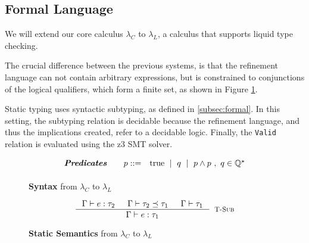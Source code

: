 \subsection{Formal Language}
We will extend our core calculus $\lambda_C$ to $\lambda_L$, 
a calculus that supports liquid type checking.

The crucial difference between the previous systems, is that 
the refinement language 
can not contain arbitrary expressions, but 
is constrained
to conjunctions of the logical qualifiers, which form a finite set, 
as shown in Figure \ref{fig:liqsyntax}.

Static typing uses syntactic subtyping, as defined in \ref{subsec:formal}. 
In this setting,  
the subtyping relation is decidable
because the refinement language, 
and thus the implications created, refer to a decidable logic.
Finally, the \texttt{Valid} relation is evaluated using 
the z3\cite{z3} SMT solver.
\begin{figure}[ht!]
\centering
$$
\begin{array}{rrcl}
\textbf{\emph{Predicates}} \quad
  & p ::=
  & 	\text{true}
  \ \mid \  q
  \ \mid \  p \land p \ , \ q \in \mathbb{Q^\star}
  \\[0.05in] 
\end{array}
$$
\caption{\textbf{Syntax} from $\lambda_C$ to $\lambda_L$}
\label{fig:liqsyntax}
\end{figure}
\begin{figure}[ht!]
\medskip {}
$$\begin{array}{cc}
\inference
  {  \hastype{\Gamma}{e}{\tau_2} && \isSubType{\Gamma}{\tau_2}{\tau_1} 
  && \isWellFormed{\Gamma}{\tau_1}
  }
  {\hastype{\Gamma}{e}{\tau_1}}
  [\tsub]
\end{array}$$
\caption{\textbf{Static Semantics} from $\lambda_C$ to $\lambda_L$}
\label{fig:rules}
\end{figure}